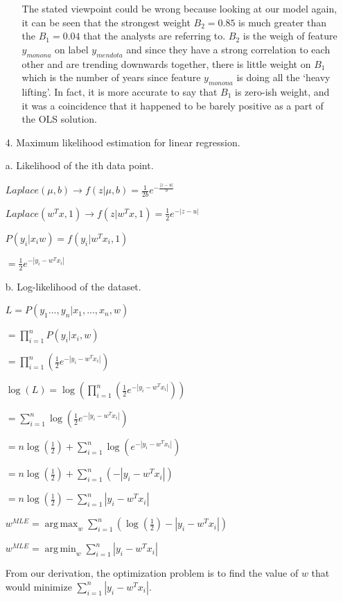 \documentclass[12pt]{report}
\DeclareMathOperator*{\argmax}{arg\,max}
\DeclareMathOperator*{\argmin}{arg\,min}
\begin{document}
\begin{enumerate}
\begin{itemize}
    The stated viewpoint could be wrong because looking at our model again, it
    can be seen that the strongest weight $B_2=0.85$ is much greater than the
    $B_1=0.04$ that the analysts are referring to. $B_2$ is the weigh of feature
    $y_{monona}$ on label $y_{mendota}$ and since they have a strong correlation
    to each other and are trending downwards together, there is little weight on
    $B_1$ which is the number of years since feature $y_{monona}$ is doing all
    the `heavy lifting'. In fact, it is more accurate to say that $B_1$ is
    zero-ish weight, and it was a coincidence that it happened to be barely
    positive as a part of the OLS solution.
  \end{itemize}

\item[4.] Maximum likelihood estimation for linear regression.

\item[a.] Likelihood of the ith data point.

  $Laplace(\mu ,b) \rightarrow f(z|\mu , b) = \frac{1}{2b}e^{-\frac{|z-u|}{b}}$

  $Laplace(w^Tx,1) \rightarrow f(z|w^Tx, 1) = \frac{1}{2}e^{-|z-u|}$

  $P(y_i|x_iw)=f(y_i|w^Tx_i,1)$

  $= \frac{1}{2}e^{-|y_i-w^Tx_i|}$
\item[b.] Log-likelihood of the dataset.

  $L = P(y_1...,y_n|x_1,...,x_n,w)$

  $=\prod_{i=1}^{n}P(y_i|x_i,w)$

  $=\prod_{i=1}^{n}(\frac{1}{2}e^{-|y_i-w^Tx_i|})$

  $\log(L) = \log(\prod_{i=1}^{n}(\frac{1}{2}e^{-|y_i-w^Tx_i|}))$

  $=\sum_{i=1}^{n}\log(\frac{1}{2}e^{-|y_i-w^Tx_i|})$

  $=n\log(\frac{1}{2})+\sum_{i=1}^{n}\log(e^{-|y_i-w^Tx_i|})$

  $=n\log(\frac{1}{2})+\sum_{i=1}^{n}(-|y_i-w^Tx_i|)$

  $=n\log(\frac{1}{2})-\sum_{i=1}^{n}|y_i-w^Tx_i|$

  $w^{MLE}=\argmax_w\sum_{i=1}^{n}(\log(\frac{1}{2}) - |y_i-w^Tx_i|)$

  $w^{MLE}=\argmin_w\sum_{i=1}^{n}|y_i-w^Tx_i|$

  From our derivation, the optimization problem is to find the value of $w$ that
  would minimize $\sum_{i=1}^{n}|y_i-w^Tx_i|$.


\end{enumerate}
\end{document}
